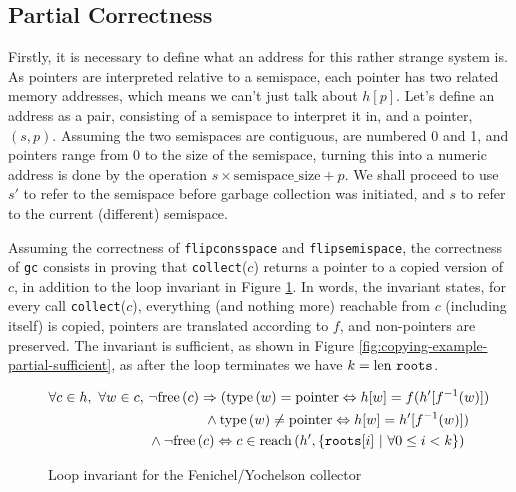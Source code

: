 \subsection{Partial Correctness}
\label{sec:copying-example-partial}

Firstly, it is necessary to define what an address for this rather
strange system is. As pointers are interpreted relative to a
semispace, each pointer has two related memory addresses, which means
we can't just talk about $h[p]$. Let's define an address as a pair,
consisting of a semispace to interpret it in, and a pointer, $(s,
p)$. Assuming the two semispaces are contiguous, are numbered 0 and 1,
and pointers range from 0 to the size of the semispace, turning this
into a numeric address is done by the operation $s \times
\mathrm{semispace\_size} + p$. We shall proceed to use $s'$ to refer
to the semispace before garbage collection was initiated, and $s$ to
refer to the current (different) semispace.

Assuming the correctness of \texttt{flipconsspace} and
\texttt{flipsemispace}, the correctness of \texttt{gc} consists in
proving that \texttt{collect}($c$) returns a pointer to a copied
version of $c$, in addition to the loop invariant in Figure
\ref{fig:copying-example-partial-invariant}. In words, the invariant
states, for every call \texttt{collect}($c$), everything (and nothing
more) reachable from $c$ (including itself) is copied, pointers are
translated according to $f$, and non-pointers are preserved. The
invariant is sufficient, as shown in Figure
\ref{fig:copying-example-partial-sufficient}, as after the loop
terminates we have $k = \mathrm{len}~ \mathtt{roots}$.

\begin{figure}[t]
  \centering
  \begin{align*}
    \forall c \in h,\ \forall w \in c,\ &\lnot\mathrm{free}\left(c\right) \Rightarrow
    (\mathrm{type}\left(w\right) = \mathrm{pointer} \Leftrightarrow h[w] = f(h'[f^{-1}(w)])\\
    &\quad\quad\quad\quad \land \mathrm{type}\left(w\right) \neq \mathrm{pointer}
    \Leftrightarrow h[w] = h'[f^{-1}(w)])\\
    &\land \lnot\mathrm{free}\left(c\right) \Leftrightarrow c \in
    \mathrm{reach}\left(h', \{\mathtt{roots}[i]~|~\forall 0 \leq i < k\}\right)
  \end{align*}
  \captionsetup{format=default}
  \caption{Loop invariant for the Fenichel/Yochelson collector}
  \label{fig:copying-example-partial-invariant}
\end{figure}

